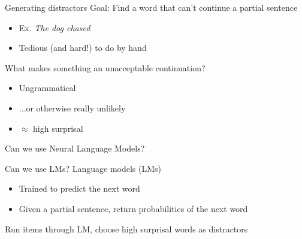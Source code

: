 \documentclass[12pt, xcolor=beamer,table,usenames,dvipsnames, ignorenonframetext, ngerman,t]{beamer}
\begin{document}
%
\begin{frame}{Generating distractors}
\pause
Goal: Find a word that can't continue a partial sentence
\begin{itemize}
	\item Ex.  \textit{The dog chased} \pause
	\item Tedious (and hard!) to do by hand
\end{itemize} \pause

What makes something an unacceptable continuation? \pause
\begin{itemize}
	\item Ungrammatical \pause
	\item ...or otherwise really unlikely \pause 
	\item $\approx$ high surprisal 
\end{itemize} \pause

Can we use Neural Language Models?
\end{frame}
%
\begin{frame}{Can we use LMs?}
	\pause
Language models (LMs)
\begin{itemize}
	\item Trained to predict the next word
	\item Given a partial sentence, return probabilities of the next word
\end{itemize}\pause

Run items through LM, choose high surprisal words as distractors

%	
\end{frame}
%
\end{document}
